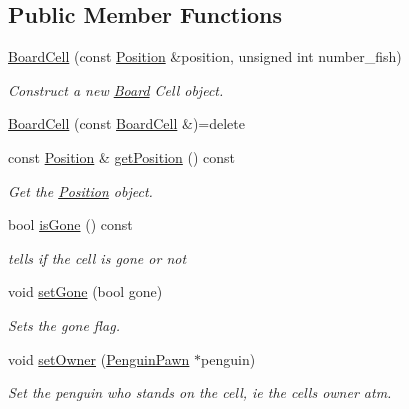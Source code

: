 \subsection*{Public Member Functions}
\begin{DoxyCompactItemize}
\item 
\hyperlink{classgame_1_1penguin_1_1_board_cell_a2c76e638f5d0d4374b422756b08cb61f}{Board\+Cell} (const \hyperlink{structgame_1_1_position}{Position} \&position, unsigned int number\+\_\+fish)
\begin{DoxyCompactList}\small\item\em Construct a new \hyperlink{classgame_1_1penguin_1_1_board}{Board} Cell object. \end{DoxyCompactList}\item 
\hyperlink{classgame_1_1penguin_1_1_board_cell_a5637880645cc7230fa2091aee3588bed}{Board\+Cell} (const \hyperlink{classgame_1_1penguin_1_1_board_cell}{Board\+Cell} \&)=delete
\item 
const \hyperlink{structgame_1_1_position}{Position} \& \hyperlink{classgame_1_1penguin_1_1_board_cell_a802b2f75d1e3136146625266f6a2c03a}{get\+Position} () const
\begin{DoxyCompactList}\small\item\em Get the \hyperlink{structgame_1_1_position}{Position} object. \end{DoxyCompactList}\item 
bool \hyperlink{classgame_1_1penguin_1_1_board_cell_a6a978b7e72ef20475771eb6e453e0a39}{is\+Gone} () const
\begin{DoxyCompactList}\small\item\em tells if the cell is gone or not \end{DoxyCompactList}\item 
void \hyperlink{classgame_1_1penguin_1_1_board_cell_a097c6986431cadcf0adac373fe01ccee}{set\+Gone} (bool gone)
\begin{DoxyCompactList}\small\item\em Sets the gone flag. \end{DoxyCompactList}\item 
void \hyperlink{classgame_1_1penguin_1_1_board_cell_a5d3fd7b5a5e170bd6fbc101f5240f4b1}{set\+Owner} (\hyperlink{classgame_1_1penguin_1_1_penguin_pawn}{Penguin\+Pawn} $\ast$penguin)
\begin{DoxyCompactList}\small\item\em Set the penguin who stands on the cell, ie the cell\textquotesingle{}s owner atm. \end{DoxyCompactList}\item 

\end{DoxyCompactItemize}
